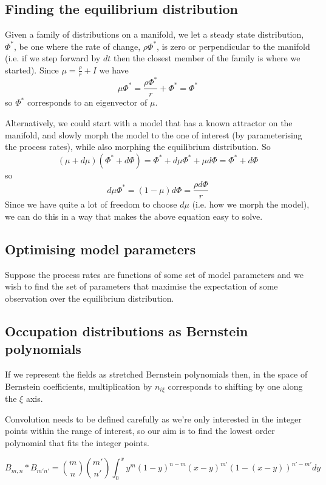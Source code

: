 \documentclass[a4paper]{article}
\begin{document}
\subsection{Finding the equilibrium distribution}

Given a family of distributions on a manifold, we let a steady state distribution, $\Phi^*$, be one where the rate of change, $\rho\Phi^*$, is zero or perpendicular to the manifold (i.e. if we step forward by $dt$ then the closest member of the family is where we started). Since $\mu = \frac{\rho}{r} + I$ we have
\[
\mu\Phi^* = \frac{\rho\Phi^*}{r} + \Phi^* = \Phi^*
\]
so $\Phi^*$ corresponds to an eigenvector of $\mu$.

Alternatively, we could start with a model that has a known attractor on the manifold, and slowly morph the model to the one of interest (by parameterising the process rates), while also morphing the equilibrium distribution. So
\[
(\mu + d\mu)(\Phi^* + d\Phi) = \Phi^* + d\mu\Phi^* + \mu d\Phi = \Phi^* + d\Phi
\]
so
\[
d\mu\Phi^*  = (1 - \mu) d\Phi = \frac{\rho d\Phi}{r}
\]
Since we have quite a lot of freedom to choose $d\mu$ (i.e. how we morph the model), we can do this in a way that makes the above equation easy to solve.

\subsection{Optimising model parameters}

Suppose the process rates are functions of some set of model parameters and we wish to find the set of parameters that maximise the expectation of some observation over the equilibrium distribution. 


\subsection{Occupation distributions as Bernstein polynomials}
If we represent the fields as stretched Bernstein polynomials then, in the space of Bernstein coefficients, multiplication by $n_{i\xi}$ corresponds to shifting by one along the $\xi$ axis.

Convolution needs to be defined carefully as we're only interested in the integer points within the range of interest, so our aim is to find the lowest order polynomial that fits the integer points.

\[
B_{m,n} \ast B_{m'n'} =   {m \choose n}{m' \choose n'} \int_{0}^x y^m(1-y)^{n-m} (x-y)^{m'}(1-(x-y))^{n'-m'} dy
\]
\end{document}
